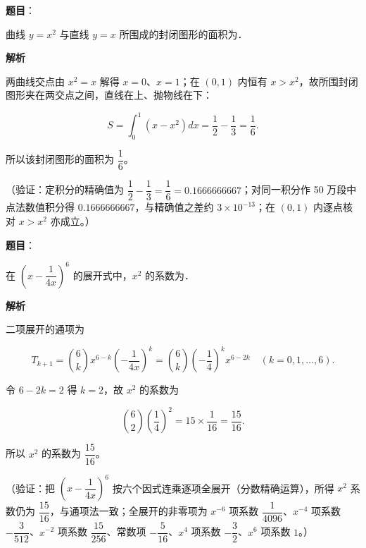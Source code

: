 \begin{answer}

\textbf{题目}：

曲线 \(y=x^2\) 与直线 \(y=x\) 所围成的封闭图形的面积为\gkblank{}．

\textbf{解析}

两曲线交点由 \(x^2=x\) 解得 \(x=0\)、\(x=1\)；在 \((0,1)\) 内恒有 \(x>x^2\)，故所围封闭图形夹在两交点之间，直线在上、抛物线在下：

\nopagebreak[4]
\[
S=\int_0^1\left(x-x^2\right)dx=\dfrac12-\dfrac13=\dfrac16.
\]

所以该封闭图形的面积为 \(\dfrac16\)。

（验证：定积分的精确值为 \(\dfrac12-\dfrac13=\dfrac16=0.1666666667\)；对同一积分作 50 万段中点法数值积分得 \(0.1666666667\)，与精确值之差约 \(3\times10^{-13}\)；在 \((0,1)\) 内逐点核对 \(x>x^2\) 亦成立。）


\end{answer}
\begin{answer}

\textbf{题目}：

在 \(\left(x-\dfrac{1}{4x}\right)^6\) 的展开式中，\(x^2\) 的系数为\gkblank{}．

\textbf{解析}

二项展开的通项为

\nopagebreak[4]
\[
T_{k+1}=\binom6k x^{6-k}\left(-\dfrac1{4x}\right)^k=\binom6k\left(-\dfrac14\right)^k x^{6-2k}\quad(k=0,1,\dots,6).
\]

令 \(6-2k=2\) 得 \(k=2\)，故 \(x^2\) 的系数为

\nopagebreak[4]
\[
\binom62\left(\dfrac14\right)^2=15\times\dfrac1{16}=\dfrac{15}{16}.
\]

所以 \(x^2\) 的系数为 \(\dfrac{15}{16}\)。

（验证：把 \(\left(x-\dfrac1{4x}\right)^6\) 按六个因式连乘逐项全展开（分数精确运算），所得 \(x^2\) 系数仍为 \(\dfrac{15}{16}\)，与通项法一致；全展开的非零项为 \(x^{-6}\) 项系数 \(\dfrac1{4096}\)、\(x^{-4}\) 项系数 \(-\dfrac3{512}\)、\(x^{-2}\) 项系数 \(\dfrac{15}{256}\)、常数项 \(-\dfrac5{16}\)、\(x^4\) 项系数 \(-\dfrac32\)、\(x^6\) 项系数 \(1\)。）


\end{answer}

